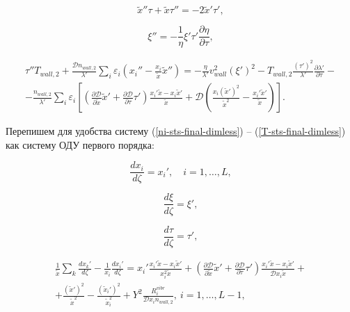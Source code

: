 \documentclass[12pt]{article}
\begin{document}
\begin{equation}
  \tilde{x}''\tau + \tilde{x}\tau'' = -2\tilde{x}'\tau',
\end{equation}

\begin{equation}
  \xi'' = -\frac{1}{\eta} \xi' \tau' \frac{\partial \eta}{\partial \tau},
\end{equation}

\begin{multline}
  \tau''T_{wall,2} + \frac{\mathcal{D}n_{wall,2}}{\lambda'}\sum_{i}\varepsilon_{i}\left(x_{i}'' - \frac{x_{i}}{\tilde{x}}\tilde{x}'' \right) = -\frac{\eta}{\lambda'} v_{wall}^2 \left(\xi' \right)^2 - T_{wall,2}\frac{\left(\tau'\right)^2}{\lambda'} \frac{\partial \lambda'}{\partial \tau} - \\
  - \frac{n_{wall,2}}{\lambda'}\sum_{i}\varepsilon_{i} \left[\left(\frac{\partial \mathcal{D}}{\partial \tilde{x}}\tilde{x}' + \frac{\partial \mathcal{D}}{\partial \tau}\tau' \right) \frac{x_{i}'\tilde{x} - x_{i}\tilde{x}'}{\tilde{x}} + \mathcal{D}\left(\frac{x_{i}\left(\tilde{x}'\right)^2}{\tilde{x}^2} - \frac{x_{i}'\tilde{x}'}{\tilde{x}} \right)  \right].\label{T-sts-final-dimless}
\end{multline}

Перепишем для удобства систему (\ref{ni-sts-final-dimless}) -- (\ref{T-sts-final-dimless}) как систему ОДУ первого порядка:

\begin{equation}
  \frac{d x_{i}}{d\zeta} = x_{i}',\quad i=1,\ldots,L,\label{eqn-dx_i-sts}
\end{equation}

\begin{equation}
  \frac{d \xi}{d\zeta} = \xi', \label{eqn-dxi-sts}
\end{equation}

\begin{equation}
  \frac{d \tau}{d\zeta} = \tau', \label{eqn-dtau-sts}
\end{equation}

\begin{multline}
\frac{1}{\tilde{x}}\sum_{k}\frac{dx_{k}'}{d\zeta} - \frac{1}{x_{i}}\frac{d x_{i}'}{d\zeta} =
  x_{i}' \frac{x_{i}'\tilde{x} - x_{i}\tilde{x}'}{x_{i}^2 \tilde{x}} + \left(\frac{\partial \mathcal{D}}{\partial \tilde{x}}\tilde{x}' + \frac{\partial \mathcal{D}}{\partial \tau}\tau' \right) \frac{x_{i}'\tilde{x} - x_{i}\tilde{x}'}{\mathcal{D}x_{i}\tilde{x}} + \\
  + \frac{\left(\tilde{x}'\right)^2}{\tilde{x}^2} - \frac{\left(\tilde{x}_{i}'\right)^2}{\tilde{x}_{i}^2} + Y^{2}\frac{R_{i}^{vibr}}{\mathcal{D}x_{i}n_{wall,2}},\:i=1,\ldots,L-1,\label{eqn-d2x_i-sts}
\end{multline}
\end{document}
